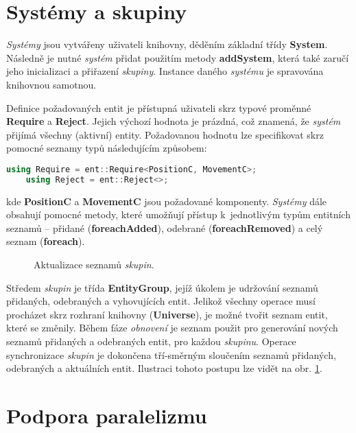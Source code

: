 \section{Systémy a skupiny}
\label{Chap:ImplSystem}

\emph{Systémy} jsou vytvářeny uživateli knihovny, děděním základní třídy \textbf{System}. Následně je nutné \emph{systém} přidat použitím metody \textbf{addSystem}, která také zaručí jeho inicializaci a přiřazení \emph{skupiny}. Instance daného \emph{systému} je spravována knihovnou samotnou.

Definice požadovaných entit je přístupná uživateli skrz typové proměnné \textbf{Require} a \textbf{Reject}. Jejich výchozí hodnota je prázdná, což znamená, že \emph{systém} přijímá všechny (aktivní) entity. Požadovanou hodnotu lze specifikovat skrz pomocné seznamy typů následujícím způsobem: 

\begin{lstlisting}[language=C++]
	using Require = ent::Require<PositionC, MovementC>;
	using Reject = ent::Reject<>;
\end{lstlisting}

\noindent kde \textbf{PositionC} a \textbf{MovementC} jsou požadované komponenty. \emph{Systémy} dále obsahují pomocné metody, které umožňují přístup k~jednotlivým typům entitních seznamů -- přidané (\textbf{foreachAdded}), odebrané (\textbf{foreachRemoved}) a celý seznam (\textbf{foreach}). 

\begin{figure}[H]
	\begin{center}
	\end{center}
	\caption{Aktualizace seznamů \emph{skupin}.}
	\label{Fig:IMPLMerge}
\end{figure}

Středem \emph{skupin} je třída \textbf{EntityGroup}, jejíž úkolem je udržování seznamů přidaných, odebraných a vyhovujících entit. Jelikož všechny operace musí procházet skrz rozhraní knihovny (\textbf{Universe}), je možné tvořit seznam entit, které se změnily. Během fáze \emph{obnovení} je seznam použit pro generování nových seznamů přidaných a odebraných entit, pro každou \emph{skupinu}. Operace synchronizace \emph{skupin} je dokončena tří-směrným sloučením seznamů přidaných, odebraných a aktuálních entit. Ilustraci tohoto postupu lze vidět na obr. \ref{Fig:IMPLMerge}.

\section{Podpora paralelizmu}

